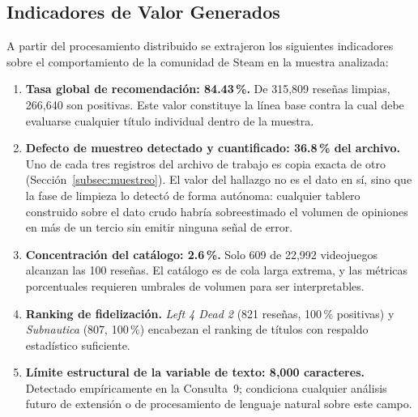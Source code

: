 \subsection{Indicadores de Valor Generados}

A partir del procesamiento distribuido se extrajeron los siguientes indicadores sobre el comportamiento de la comunidad de Steam en la muestra analizada:

\begin{enumerate}[leftmargin=*]
    \item \textbf{Tasa global de recomendación: 84.43\,\%.} De 315,809 reseñas limpias, 266,640 son positivas. Este valor constituye la línea base contra la cual debe evaluarse cualquier título individual dentro de la muestra.
    \item \textbf{Defecto de muestreo detectado y cuantificado: 36.8\,\% del archivo.} Uno de cada tres registros del archivo de trabajo es copia exacta de otro (Sección~\ref{subsec:muestreo}). El valor del hallazgo no es el dato en sí, sino que la fase de limpieza lo detectó de forma autónoma: cualquier tablero construido sobre el dato crudo habría sobreestimado el volumen de opiniones en más de un tercio sin emitir ninguna señal de error.
    \item \textbf{Concentración del catálogo: 2.6\,\%.} Solo 609 de 22,992 videojuegos alcanzan las 100 reseñas. El catálogo es de cola larga extrema, y las métricas porcentuales requieren umbrales de volumen para ser interpretables.
    \item \textbf{Ranking de fidelización.} \textit{Left 4 Dead 2} (821 reseñas, 100\,\% positivas) y \textit{Subnautica} (807, 100\,\%) encabezan el ranking de títulos con respaldo estadístico suficiente.
    \item \textbf{Límite estructural de la variable de texto: 8,000 caracteres.} Detectado empíricamente en la Consulta~9; condiciona cualquier análisis futuro de extensión o de procesamiento de lenguaje natural sobre este campo.
\end{enumerate}
